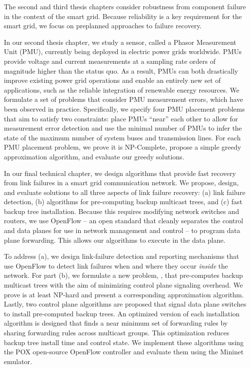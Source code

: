 The second and third thesis chapters consider robustness from component failure  in the context of the smart grid. Because reliability is a key requirement for the smart grid, we focus on 
preplanned approaches to failure recovery.

In our second thesis chapter, we study a sensor, called a Phasor Measurement Unit (PMU), currently being deployed in electric power grids worldwide. 
PMUs provide voltage and current measurements at a sampling rate orders of magnitude higher than the status quo.  As a result, PMUs can 
both drastically improve existing power grid operations and enable an entirely new set of applications, such as the reliable integration of renewable energy resources. 
We formulate a set of problems that consider PMU measurement errors, which have been observed in practice.  Specifically, we specify four PMU placement problems
that aim to satisfy two constraints: place PMUs ``near'' each other to allow for measurement error detection and use the minimal number of PMUs to infer the state of the maximum number of system buses and transmission lines. 
For each PMU placement problem, we prove it is NP-Complete, propose a simple greedy approximation algorithm, and evaluate our greedy solutions.

In our final technical chapter, we design algorithms that provide fast recovery from link failures in a smart grid communication network. 
We propose, design, and evaluate solutions to all three aspects of link failure recovery: (a) link failure detection, (b) algorithms for pre-computing backup multicast trees, and
(c) fast backup tree installation. Because this requires modifying network switches and routers, we use OpenFlow -- an open standard that cleanly separates the control 
and data planes for use in network management and control -- to program data plane forwarding.  This allows our algorithms to execute in the data plane.


To address (a), we design link-failure detection and reporting mechanisms that use OpenFlow to detect link failures when and where they occur \emph{inside} the network.
For part (b), we formulate a new problem, \mcs, that pre-computes backup multicast trees with the aim of minimizing control plane signaling overhead. We prove \mc 
is at least NP-hard and present a corresponding approximation algorithm.
Lastly, two control plane algorithms are proposed that signal data plane switches to install pre-computed backup trees. 
An optimized version of each installation algorithm is designed that finds a near minimum set of forwarding rules 
by sharing forwarding rules across multicast groups. This optimization
reduces backup tree install time and control state.  
We implement these algorithms using the POX open-source OpenFlow controller and evaluate them using the Mininet emulator. 






